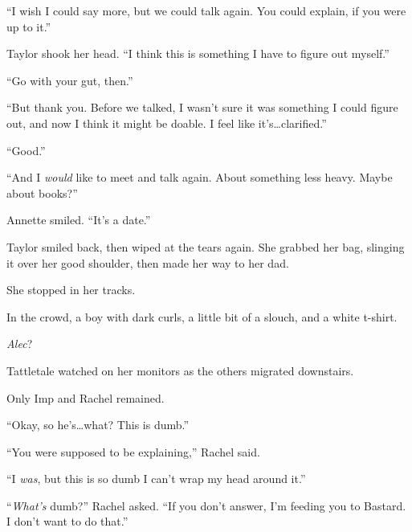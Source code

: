 ``I wish I could say more, but we could talk again.  You could explain, if you were up to it.''



Taylor shook her head.  ``I think this is something I have to figure out myself.''



``Go with your gut, then.''



``But thank you.  Before we talked, I wasn't sure it was something I could figure out, and now I think it might be doable.  I feel like it's\ldots clarified.''



``Good.''



``And I \emph{would} like to meet and talk again.  About something less heavy.  Maybe about books?''



Annette smiled.  ``It's a date.''



Taylor smiled back, then wiped at the tears again.  She grabbed her bag, slinging it over her good shoulder, then made her way to her dad.



She stopped in her tracks.



In the crowd, a boy with dark curls, a little bit of a slouch, and a white t-shirt.



\emph{Alec}?



\blacksquare



Tattletale watched on her monitors as the others migrated downstairs.



Only Imp and Rachel remained.



``Okay, so he's\ldots what?  This is dumb.''



``You were supposed to be explaining,'' Rachel said.



``I \emph{was}, but this is so dumb I can't wrap my head around it.''



``\emph{What's} dumb?'' Rachel asked.  ``If you don't answer, I'm feeding you to Bastard.  I don't want to do that.''




